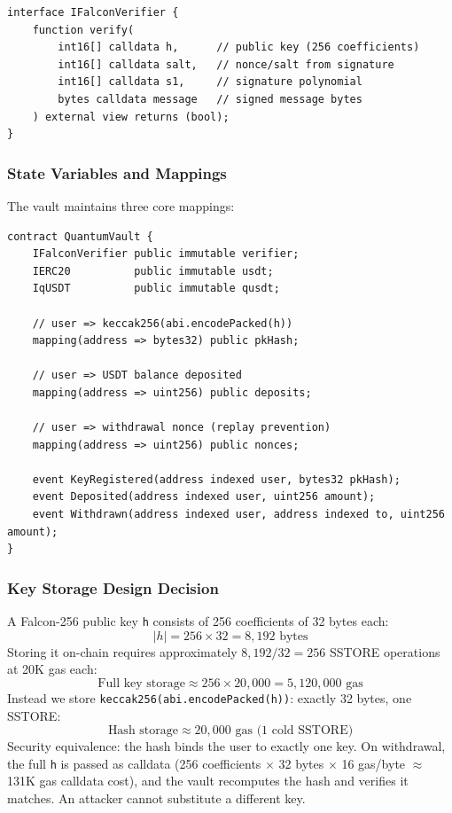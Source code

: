 \documentclass[11pt,a4paper]{article}
\begin{document}
\begin{lstlisting}[style=solidity, caption={IFalconVerifier interface}]
interface IFalconVerifier {
    function verify(
        int16[] calldata h,      // public key (256 coefficients)
        int16[] calldata salt,   // nonce/salt from signature
        int16[] calldata s1,     // signature polynomial
        bytes calldata message   // signed message bytes
    ) external view returns (bool);
}
\end{lstlisting}

\subsubsection{State Variables and Mappings}

The vault maintains three core mappings:

\begin{lstlisting}[style=solidity, caption={QuantumVault state variables}]
contract QuantumVault {
    IFalconVerifier public immutable verifier;
    IERC20          public immutable usdt;
    IqUSDT          public immutable qusdt;

    // user => keccak256(abi.encodePacked(h))
    mapping(address => bytes32) public pkHash;

    // user => USDT balance deposited
    mapping(address => uint256) public deposits;

    // user => withdrawal nonce (replay prevention)
    mapping(address => uint256) public nonces;

    event KeyRegistered(address indexed user, bytes32 pkHash);
    event Deposited(address indexed user, uint256 amount);
    event Withdrawn(address indexed user, address indexed to, uint256 amount);
}
\end{lstlisting}

\subsubsection{Key Storage Design Decision}

\begin{infobox}
A Falcon-256 public key \texttt{h} consists of 256 coefficients of 32 bytes each:
\[
  |h| = 256 \times 32 = 8{,}192 \text{ bytes}
\]
Storing it on-chain requires approximately $8{,}192 / 32 = 256$ SSTORE operations at 20K gas each:
\[
  \text{Full key storage} \approx 256 \times 20{,}000 = 5{,}120{,}000 \text{ gas}
\]
Instead we store \texttt{keccak256(abi.encodePacked(h))}: exactly 32 bytes, one SSTORE:
\[
  \text{Hash storage} \approx 20{,}000 \text{ gas (1 cold SSTORE)}
\]
Security equivalence: the hash binds the user to exactly one key. On withdrawal, the full \texttt{h} is passed as calldata (256 coefficients $\times$ 32 bytes $\times$ 16 gas/byte $\approx$ 131K gas calldata cost), and the vault recomputes the hash and verifies it matches. An attacker cannot substitute a different key.
\end{infobox}
\end{document}

